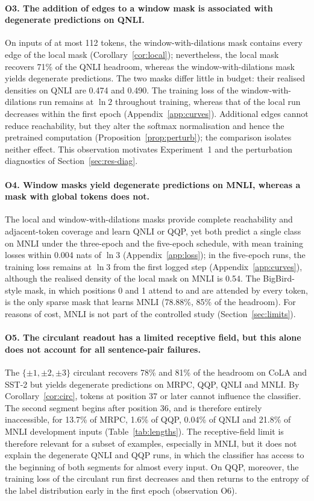 \documentclass[10pt]{article}
\begin{document}
\paragraph{O3. The addition of edges to a window mask is associated with degenerate predictions on QNLI.} On inputs of at most 112 tokens, the window-with-dilations mask contains every edge of the local mask (Corollary~\ref{cor:local}); nevertheless, the local mask recovers 71\% of the QNLI headroom, whereas the window-with-dilations mask yields degenerate predictions. The two masks differ little in budget: their realised densities on QNLI are 0.474 and 0.490. The training loss of the window-with-dilations run remains at $\ln2$ throughout training, whereas that of the local run decreases within the first epoch (Appendix~\ref{app:curves}). Additional edges cannot reduce reachability, but they alter the softmax normalisation and hence the pretrained computation (Proposition~\ref{prop:perturb}); the comparison isolates neither effect. This observation motivates Experiment~1 and the perturbation diagnostics of Section~\ref{sec:res-diag}.

\paragraph{O4. Window masks yield degenerate predictions on MNLI, whereas a mask with global tokens does not.} The local and window-with-dilations masks provide complete reachability and adjacent-token coverage and learn QNLI or QQP, yet both predict a single class on MNLI under the three-epoch and the five-epoch schedule, with mean training losses within 0.004 nats of $\ln3$ (Appendix~\ref{app:loss}); in the five-epoch runs, the training loss remains at $\ln3$ from the first logged step (Appendix~\ref{app:curves}), although the realised density of the local mask on MNLI is 0.54. The BigBird-style mask, in which positions 0 and 1 attend to and are attended by every token, is the only sparse mask that learns MNLI (78.88\%, 85\% of the headroom). For reasons of cost, MNLI is not part of the controlled study (Section~\ref{sec:limits}).

\paragraph{O5. The circulant readout has a limited receptive field, but this alone does not account for all sentence-pair failures.} The $\{\pm1,\pm2,\pm3\}$ circulant recovers 78\% and 81\% of the headroom on CoLA and SST-2 but yields degenerate predictions on MRPC, QQP, QNLI and MNLI. By Corollary~\ref{cor:circ}, tokens at position 37 or later cannot influence the classifier. The second segment begins after position 36, and is therefore entirely inaccessible, for 13.7\% of MRPC, 1.6\% of QQP, 0.04\% of QNLI and 21.8\% of MNLI development inputs (Table~\ref{tab:lengths}). The receptive-field limit is therefore relevant for a subset of examples, especially in MNLI, but it does not explain the degenerate QNLI and QQP runs, in which the classifier has access to the beginning of both segments for almost every input. On QQP, moreover, the training loss of the circulant run first decreases and then returns to the entropy of the label distribution early in the first epoch (observation O6).
\end{document}
